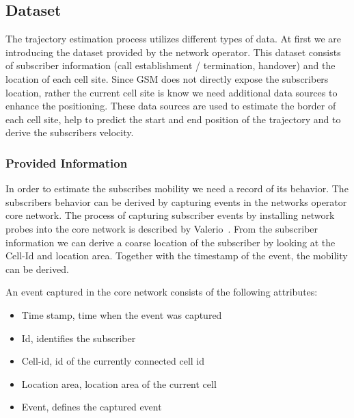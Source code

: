 \documentclass[twocolumn]{bmcart}%
\begin{document}
\subsection*{Dataset}
The trajectory estimation process utilizes different types of data. At first we are introducing the dataset provided by the network operator. This dataset consists of subscriber information (call establishment / termination, handover) and the location of each cell site. Since GSM does not directly expose the subscribers location, rather the current cell site is know we need additional data sources to enhance the positioning. These data sources are used to estimate the border of each cell site, help to predict the start and end position of the trajectory and to derive the subscribers velocity.
\subsubsection*{Provided Information}
In order to estimate the subscribes mobility we need a record of its behavior. The subscribers behavior can be derived by capturing events in the networks operator core network. The process of capturing subscriber events by installing network probes into the core network is described by Valerio~\cite{RoadCell2009}. From the subscriber information we can derive a coarse location of the subscriber by looking at the Cell-Id and location area. Together with the timestamp of the event, the mobility can be derived.

An event captured in the core network consists of the following attributes:
\begin{itemize}
	\item Time stamp, time when the event was captured
	\item Id, identifies the subscriber
	\item Cell-id, id of the currently connected cell id
	\item Location area, location area of the current cell
	\item Event, defines the captured event
\end{itemize}
\end{document}
